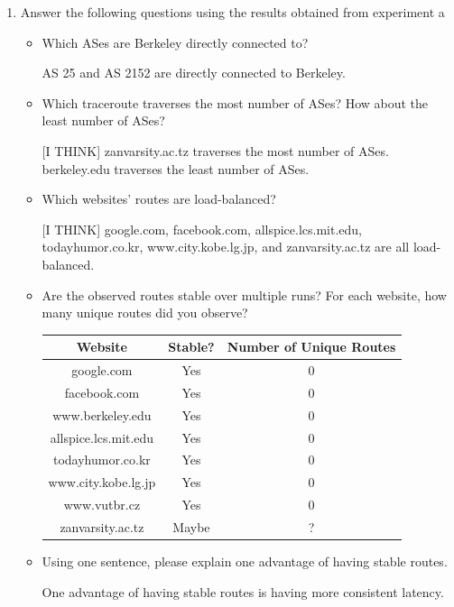 \documentclass[10pt]{article}
\begin{document}
\begin{enumerate}

\item Answer the following questions using the results obtained from experiment a

\begin{itemize}

\item Which ASes are Berkeley directly connected to?

AS 25 and AS 2152 are directly connected to Berkeley.

\item Which traceroute traverses the most number of ASes? How about the least number of ASes?

[I THINK] zanvarsity.ac.tz traverses the most number of ASes. berkeley.edu traverses the least number of ASes.

\item Which websites' routes are load-balanced?

[I THINK] google.com, facebook.com, allspice.lcs.mit.edu, todayhumor.co.kr, www.city.kobe.lg.jp, and zanvarsity.ac.tz are all load-balanced.

\item Are the observed routes stable over multiple runs? For each website, how many unique routes did you observe?

\begin{center}
\begin{tabular}{ || c | c | c || }
\hline
Website & Stable? & Number of Unique Routes \\
\hline \hline
google.com & Yes & 0 \\
\hline
facebook.com & Yes & 0 \\
\hline
www.berkeley.edu & Yes & 0 \\
\hline
allspice.lcs.mit.edu & Yes & 0 \\
\hline
todayhumor.co.kr & Yes & 0 \\
\hline
www.city.kobe.lg.jp & Yes & 0 \\
\hline
www.vutbr.cz & Yes & 0 \\
\hline
zanvarsity.ac.tz & Maybe & ? \\
\hline
\end{tabular}
\end{center}

\item Using one sentence, please explain one advantage of having stable routes.

One advantage of having stable routes is having more consistent latency.


\end{itemize}
\end{enumerate}
\end{document}
